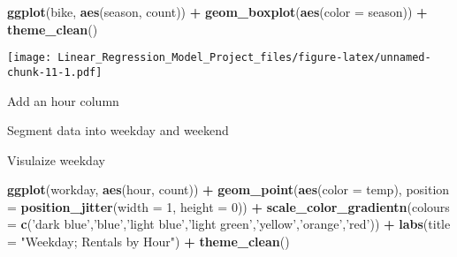 \documentclass[]{article}
\newenvironment{Shaded}{\begin{snugshade}}{\end{snugshade}}
\newcommand{\KeywordTok}[1]{\textcolor[rgb]{0.13,0.29,0.53}{\textbf{#1}}}
\newcommand{\DataTypeTok}[1]{\textcolor[rgb]{0.13,0.29,0.53}{#1}}
\newcommand{\DecValTok}[1]{\textcolor[rgb]{0.00,0.00,0.81}{#1}}
\newcommand{\StringTok}[1]{\textcolor[rgb]{0.31,0.60,0.02}{#1}}
\newcommand{\ControlFlowTok}[1]{\textcolor[rgb]{0.13,0.29,0.53}{\textbf{#1}}}
\newcommand{\OperatorTok}[1]{\textcolor[rgb]{0.81,0.36,0.00}{\textbf{#1}}}
\newcommand{\NormalTok}[1]{#1}
\begin{document}
\begin{Shaded}
\begin{Highlighting}[]
\KeywordTok{ggplot}\NormalTok{(bike, }\KeywordTok{aes}\NormalTok{(season, count)) }\OperatorTok{+}
\StringTok{    }\KeywordTok{geom_boxplot}\NormalTok{(}\KeywordTok{aes}\NormalTok{(}\DataTypeTok{color =}\NormalTok{ season)) }\OperatorTok{+}
\StringTok{    }\KeywordTok{theme_clean}\NormalTok{()}
\end{Highlighting}
\end{Shaded}

\texttt{[image: Linear\_Regression\_Model\_Project\_files/figure-latex/unnamed-chunk-11-1.pdf]}

Add an hour column

\begin{Shaded}
\end{Shaded}

Segment data into weekday and weekend

\begin{Shaded}
\end{Shaded}

Visulaize weekday

\begin{Shaded}
\begin{Highlighting}[]
\KeywordTok{ggplot}\NormalTok{(workday, }\KeywordTok{aes}\NormalTok{(hour, count)) }\OperatorTok{+}
\StringTok{    }\KeywordTok{geom_point}\NormalTok{(}\KeywordTok{aes}\NormalTok{(}\DataTypeTok{color =}\NormalTok{ temp), }\DataTypeTok{position =} \KeywordTok{position_jitter}\NormalTok{(}\DataTypeTok{width =} \DecValTok{1}\NormalTok{, }\DataTypeTok{height =} \DecValTok{0}\NormalTok{)) }\OperatorTok{+}
\StringTok{    }\KeywordTok{scale_color_gradientn}\NormalTok{(}\DataTypeTok{colours =} \KeywordTok{c}\NormalTok{(}\StringTok{'dark blue'}\NormalTok{,}\StringTok{'blue'}\NormalTok{,}\StringTok{'light blue'}\NormalTok{,}\StringTok{'light green'}\NormalTok{,}\StringTok{'yellow'}\NormalTok{,}\StringTok{'orange'}\NormalTok{,}\StringTok{'red'}\NormalTok{)) }\OperatorTok{+}
\StringTok{    }\KeywordTok{labs}\NormalTok{(}\DataTypeTok{title =} \StringTok{"Weekday; Rentals by Hour"}\NormalTok{) }\OperatorTok{+}
\StringTok{    }\KeywordTok{theme_clean}\NormalTok{()}
\end{Highlighting}
\end{Shaded}
\end{document}
